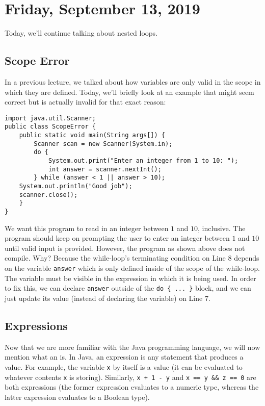 \section{Friday, September 13, 2019}

Today, we'll continue talking about nested loops.


\subsection{Scope Error}

In a previous lecture, we talked about how variables are only valid in the scope in which they are defined. Today, we'll briefly look at an example that might seem correct but is actually invalid for that exact reason:

\begin{lstlisting}
import java.util.Scanner;
public class ScopeError {
    public static void main(String args[]) {
        Scanner scan = new Scanner(System.in);
        do {
            System.out.print("Enter an integer from 1 to 10: ");
            int answer = scanner.nextInt();
        } while (answer < 1 || answer > 10);
    System.out.println("Good job");
    scanner.close();
    }
}
\end{lstlisting}

We want this program to read in an integer between $1$ and $10$, inclusive. The program should keep on prompting the user to enter an integer between $1$ and $10$ until valid input is provided. However, the program as shown above does not compile. Why? Because the while-loop's terminating condition on Line $8$ depends on the variable \verb!answer! which is only defined inside of the scope of the while-loop. The variable must be visible in the expression in which it is being used. In order to fix this, we can declare \verb!answer! outside of the \verb!do { ... }! block, and we can just update its value (instead of declaring the variable) on Line $7$. 

\subsection{Expressions}

Now that we are more familiar with the Java programming language, we will now mention what an  is. In Java, an expression is any statement that produces a value. For example, the variable \verb!x! by itself is a value (it can be evaluated to whatever contents \verb!x! is storing). Similarly, \verb!x + 1 - y! and \verb!x == y && z == 0! are both expressions (the former expression evaluates to a numeric type, whereas the latter expression evaluates to a Boolean type). \\

